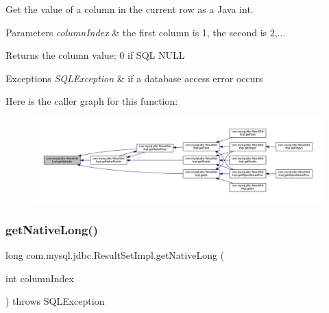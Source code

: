 Get the value of a column in the current row as a Java int.


\begin{DoxyParams}{Parameters}
{\em column\+Index} & the first column is 1, the second is 2,...\\
\hline
\end{DoxyParams}
\begin{DoxyReturn}{Returns}
the column value; 0 if S\+QL N\+U\+LL
\end{DoxyReturn}

\begin{DoxyExceptions}{Exceptions}
{\em S\+Q\+L\+Exception} & if a database access error occurs \\
\hline
\end{DoxyExceptions}
Here is the caller graph for this function\+:
\nopagebreak
\begin{figure}[H]
\begin{center}
\leavevmode
\includegraphics[width=350pt]{classcom_1_1mysql_1_1jdbc_1_1_result_set_impl_a43ab3c7c0eef581dfd7643d15d8f3eb4_icgraph}
\end{center}
\end{figure}
\mbox{\label{classcom_1_1mysql_1_1jdbc_1_1_result_set_impl_a490267a20e1362fb98cde92a6424706a}} 
\subsubsection{\texorpdfstring{get\+Native\+Long()}{getNativeLong()}}
{\footnotesize\ttfamily long com.\+mysql.\+jdbc.\+Result\+Set\+Impl.\+get\+Native\+Long (\begin{DoxyParamCaption}\item[{int}]{column\+Index }\end{DoxyParamCaption}) throws S\+Q\+L\+Exception\hspace{0.3cm}{\ttfamily [protected]}}

